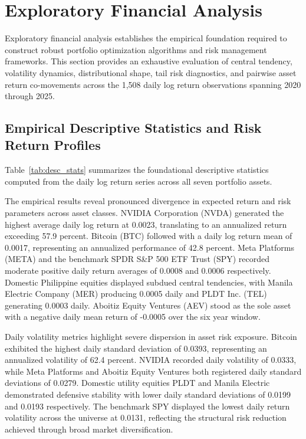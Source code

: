 \section{Exploratory Financial Analysis}

Exploratory financial analysis establishes the empirical foundation required to construct robust portfolio optimization algorithms and risk management frameworks. This section provides an exhaustive evaluation of central tendency, volatility dynamics, distributional shape, tail risk diagnostics, and pairwise asset return co-movements across the 1,508 daily log return observations spanning 2020 through 2025.

\subsection{Empirical Descriptive Statistics and Risk Return Profiles}

Table~\ref{tab:desc_stats} summarizes the foundational descriptive statistics computed from the daily log return series across all seven portfolio assets.



The empirical results reveal pronounced divergence in expected return and risk parameters across asset classes. NVIDIA Corporation (NVDA) generated the highest average daily log return at 0.0023, translating to an annualized return exceeding 57.9 percent. Bitcoin (BTC) followed with a daily log return mean of 0.0017, representing an annualized performance of 42.8 percent. Meta Platforms (META) and the benchmark SPDR S\&P 500 ETF Trust (SPY) recorded moderate positive daily return averages of 0.0008 and 0.0006 respectively. Domestic Philippine equities displayed subdued central tendencies, with Manila Electric Company (MER) producing 0.0005 daily and PLDT Inc. (TEL) generating 0.0003 daily. Aboitiz Equity Ventures (AEV) stood as the sole asset with a negative daily mean return of -0.0005 over the six year window.

Daily volatility metrics highlight severe dispersion in asset risk exposure. Bitcoin exhibited the highest daily standard deviation of 0.0393, representing an annualized volatility of 62.4 percent. NVIDIA recorded daily volatility of 0.0333, while Meta Platforms and Aboitiz Equity Ventures both registered daily standard deviations of 0.0279. Domestic utility equities PLDT and Manila Electric demonstrated defensive stability with lower daily standard deviations of 0.0199 and 0.0193 respectively. The benchmark SPY displayed the lowest daily return volatility across the universe at 0.0131, reflecting the structural risk reduction achieved through broad market diversification.

